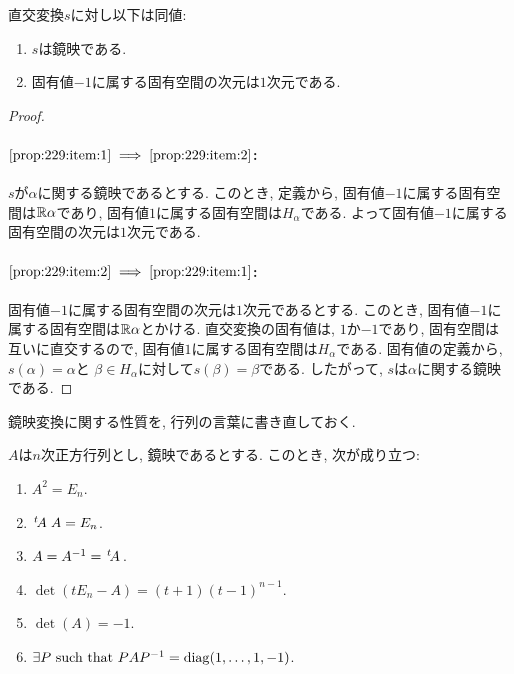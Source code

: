 \begin{prop}
  直交変換$s$に対し以下は同値:
  \begin{enumerate}
  \item
    \label{prop:229:item:1}
    $s$は鏡映である.
  \item
    \label{prop:229:item:2}
    固有値$-1$に属する固有空間の次元は$1$次元である.
  \end{enumerate}
\end{prop}
\begin{proof}
  \paragraph{ $\ref{prop:229:item:1}\implies\ref{prop:229:item:2}$:}
  $s$が$\alpha$に関する鏡映であるとする.
  このとき, 定義から,
  固有値$-1$に属する固有空間は$\mathbb{R}\alpha$であり,
  固有値$1$に属する固有空間は$H_\alpha$である.
  よって固有値$-1$に属する固有空間の次元は$1$次元である.

  \paragraph{ $\ref{prop:229:item:2}\implies\ref{prop:229:item:1}$:}
  固有値$-1$に属する固有空間の次元は$1$次元であるとする.
  このとき, 固有値$-1$に属する固有空間は$\mathbb{R}\alpha$とかける.
  直交変換の固有値は, $1$か$-1$であり, 固有空間は互いに直交するので,
  固有値$1$に属する固有空間は$H_\alpha$である.
  固有値の定義から,
  $s(\alpha)=\alpha$と
  $\beta\in H_\alpha$に対して$s(\beta)=\beta$である.
  したがって,
  $s$は$\alpha$に関する鏡映である.
\end{proof}

鏡映変換に関する性質を, 行列の言葉に書き直しておく.
\begin{cor}
  $A$は$n$次正方行列とし, 鏡映であるとする.
  このとき,
  次が成り立つ:
  \begin{enumerate}
  \item $A^2=E_n$.
  \item $\left.^{t}\!A\right.A=E_n$.
  \item $A=A^{-1}=\left.^{t}\!A\right.$.
  \item $\det(tE_n-A)=(t+1)(t-1)^{n-1}$.
  \item $\det(A)=-1$.
  \item $\exists P \text{ such that } PAP^{-1}=\operatorname{diag}(1,\ldots,1,-1)$.
  \end{enumerate}
\end{cor}



